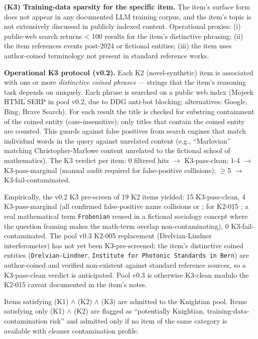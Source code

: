 \documentclass{article}
\begin{document}
\textbf{(K3) Training-data sparsity for the specific item.} The item's
surface form does not appear in any documented LLM training corpus, and
the item's topic is not extensively discussed in publicly indexed
content. Operational proxies: (i) public-web search returns \textless{}
100 results for the item's distinctive phrasing; (ii) the item
references events post-2024 or fictional entities; (iii) the item uses
author-coined terminology not present in standard reference works.

\textbf{Operational K3 protocol (v0.2).} Each K2 (novel-synthetic) item
is associated with one or more \emph{distinctive coined phrases} ---
strings that the item's reasoning task depends on uniquely. Each phrase
is searched on a public web index (Mojeek HTML SERP in pool v0.2, due to
DDG anti-bot blocking; alternatives: Google, Bing, Brave Search). For
each result the title is checked for substring containment of the coined
entity (case-insensitive); only titles that contain the coined entity
are counted. This guards against false positives from search engines
that match individual words in the query against unrelated content
(e.g., ``Marlovian'' matching Christopher-Marlowe content unrelated to
the fictional school of mathematics). The K3 verdict per item: 0
filtered hits \ensuremath{\rightarrow} K3-pass-clean; 1-4 \ensuremath{\rightarrow} K3-pass-marginal (manual audit
required for false-positive collisions); \ensuremath{\geq}5 \ensuremath{\rightarrow} K3-fail-contaminated.

Empirically, the v0.2 K3 pre-screen of 19 K2 items yielded: 15
K3-pass-clean, 4 K3-pass-marginal (all confirmed false-positive name
collisions or ; for K2-015 ; a real mathematical term \texttt{Frobenian}
reused in a fictional sociology concept where the question framing makes
the math-term overlap non-contaminating), 0 K3-fail-contaminated. The
pool v0.3 K2-005 replacement (Drelvian-Lindner interferometer) has not
yet been K3-pre-screened; the item's distinctive coined entities
(\texttt{Drelvian\textasciigrave{}\textasciigrave{}-Lindner},
\texttt{Institute\ for\ Photonic\ Standards\ in\ Bern}) are
author-coined and verified non-existent against standard reference
sources, so a K3-pass-clean verdict is anticipated. Pool v0.3 is
otherwise K3-clean modulo the K2-015 caveat documented in the item's
notes.

Items satisfying (K1) \ensuremath{\wedge} (K2) \ensuremath{\wedge} (K3) are admitted to the Knightian pool.
Items satisfying only (K1) \ensuremath{\wedge} (K2) are flagged as ``potentially
Knightian, training-data-contamination risk'' and admitted only if no
item of the same category is available with cleaner contamination
profile.
\end{document}
